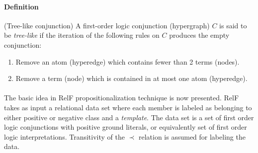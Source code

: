 \documentclass[11pt,twoside,a4paper]{book}
\newcounter{Definition}
\begin{document}
\paragraph{Definition}   (Tree-like conjunction) A first-order logic conjunction (hypergraph) $C$
is said to be \emph{tree-like} if the iteration of the following rules on $C$
produces the empty conjunction:
\begin{enumerate}
 \item Remove an atom (hyperedge) which contains fewer than 2 terms (nodes).
 \item Remove a term (node) which is contained in at most one atom (hyperedge).
\end{enumerate}


\paragraph{ } The basic idea in RelF propositionalization technique is now presented.
RelF takes as input a relational data set
where each member is labeled as belonging to either positive or negative class
and a \emph{template}. 
The data set is a set of first order logic conjunctions with positive ground literals,
or equivalently set of first order logic interpretations.
Transitivity of the $\prec$ relation is assumed for labeling the data.
\end{document}
